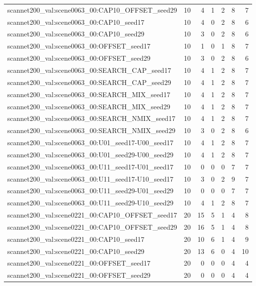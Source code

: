 \begin{table}[t]
\begin{tabular}{lrrrrrr}
scannet200\_val:scene0063\_00:CAP10\_OFFSET\_seed29 & 10 & 4 & 1 & 2 & 8 & 7 \\
scannet200\_val:scene0063\_00:CAP10\_seed17 & 10 & 4 & 0 & 2 & 8 & 6 \\
scannet200\_val:scene0063\_00:CAP10\_seed29 & 10 & 3 & 0 & 2 & 8 & 6 \\
scannet200\_val:scene0063\_00:OFFSET\_seed17 & 10 & 1 & 0 & 1 & 8 & 7 \\
scannet200\_val:scene0063\_00:OFFSET\_seed29 & 10 & 3 & 0 & 2 & 8 & 6 \\
scannet200\_val:scene0063\_00:SEARCH\_CAP\_seed17 & 10 & 4 & 1 & 2 & 8 & 7 \\
scannet200\_val:scene0063\_00:SEARCH\_CAP\_seed29 & 10 & 4 & 1 & 2 & 8 & 7 \\
scannet200\_val:scene0063\_00:SEARCH\_MIX\_seed17 & 10 & 4 & 1 & 2 & 8 & 7 \\
scannet200\_val:scene0063\_00:SEARCH\_MIX\_seed29 & 10 & 4 & 1 & 2 & 8 & 7 \\
scannet200\_val:scene0063\_00:SEARCH\_NMIX\_seed17 & 10 & 4 & 1 & 2 & 8 & 7 \\
scannet200\_val:scene0063\_00:SEARCH\_NMIX\_seed29 & 10 & 3 & 0 & 2 & 8 & 6 \\
scannet200\_val:scene0063\_00:U01\_seed17-U00\_seed17 & 10 & 4 & 1 & 2 & 8 & 7 \\
scannet200\_val:scene0063\_00:U01\_seed29-U00\_seed29 & 10 & 4 & 1 & 2 & 8 & 7 \\
scannet200\_val:scene0063\_00:U11\_seed17-U01\_seed17 & 10 & 0 & 0 & 0 & 7 & 7 \\
scannet200\_val:scene0063\_00:U11\_seed17-U10\_seed17 & 10 & 3 & 0 & 2 & 9 & 7 \\
scannet200\_val:scene0063\_00:U11\_seed29-U01\_seed29 & 10 & 0 & 0 & 0 & 7 & 7 \\
scannet200\_val:scene0063\_00:U11\_seed29-U10\_seed29 & 10 & 4 & 1 & 2 & 8 & 7 \\
scannet200\_val:scene0221\_00:CAP10\_OFFSET\_seed17 & 20 & 15 & 5 & 1 & 4 & 8 \\
scannet200\_val:scene0221\_00:CAP10\_OFFSET\_seed29 & 20 & 16 & 5 & 1 & 4 & 8 \\
scannet200\_val:scene0221\_00:CAP10\_seed17 & 20 & 10 & 6 & 1 & 4 & 9 \\
scannet200\_val:scene0221\_00:CAP10\_seed29 & 20 & 13 & 6 & 0 & 4 & 10 \\
scannet200\_val:scene0221\_00:OFFSET\_seed17 & 20 & 0 & 0 & 0 & 4 & 4 \\
scannet200\_val:scene0221\_00:OFFSET\_seed29 & 20 & 0 & 0 & 0 & 4 & 4 \\

\end{tabular}
\end{table}
